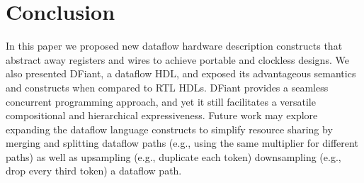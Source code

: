 \section{Conclusion}
\label{sec:conclusion}
In this paper we proposed new dataflow hardware description constructs that abstract away registers and wires to achieve portable and clockless designs. We also presented DFiant, a dataflow HDL, and exposed its advantageous semantics and constructs when compared to RTL HDLs. DFiant provides a seamless concurrent programming approach, and yet it still facilitates a versatile compositional and hierarchical expressiveness. 
Future work may explore expanding the dataflow language constructs to simplify resource sharing by merging and splitting dataflow paths (e.g., using the same multiplier for different paths) as well as upsampling (e.g., duplicate each token) downsampling (e.g., drop every third token) a dataflow path. 
